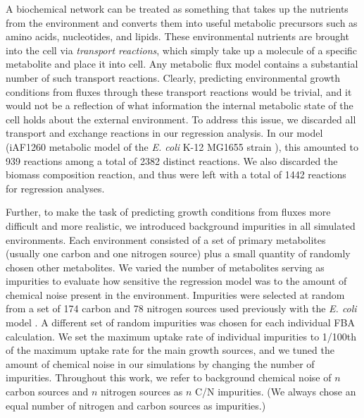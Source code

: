 \documentclass[12pt]{article}
\begin{document}
A biochemical network can be treated as something that takes up the nutrients from the environment and converts them into useful metabolic precursors such as amino acids, nucleotides, and lipids. These environmental nutrients are brought into the cell via \emph{transport reactions}, which simply take up a molecule of a specific metabolite and place it into cell. Any metabolic flux model contains a substantial number of such transport reactions. Clearly, predicting environmental growth conditions from fluxes through these transport reactions would be trivial, and it would not be a reflection of what information the internal metabolic state of the cell holds about the external environment. To address this issue, we discarded all transport and exchange reactions in our regression analysis. In our model (iAF1260 metabolic model of the \emph{E. coli} K-12 MG1655 strain \cite{Schellenbergeretal2010}), this amounted to 939 reactions among a total of 2382 distinct reactions. We also discarded the biomass composition reaction, and thus were left with a total of 1442 reactions for regression analyses.

Further, to make the task of predicting growth conditions from fluxes more difficult and more realistic, we introduced background impurities in all simulated environments. Each environment consisted of a set of primary metabolites (usually one carbon and one nitrogen source) plus a small quantity of randomly chosen other metabolites. We varied the number of metabolites serving as impurities to evaluate how sensitive the regression model was to the amount of chemical noise present in the environment. Impurities were selected at random from a set of 174 carbon and 78 nitrogen sources used previously with the \emph{E. coli} model \cite{Feistetal2007}. A different set of random impurities was chosen for each individual FBA calculation. We set the maximum uptake rate of individual impurities to 1/100th of the maximum uptake rate for the main growth sources, and we tuned the amount of chemical noise in our simulations by changing the number of impurities. Throughout this work, we refer to background chemical noise of $n$ carbon sources and $n$ nitrogen sources as $n$ C/N impurities. (We always chose an equal number of nitrogen and carbon sources as impurities.)
\end{document}
